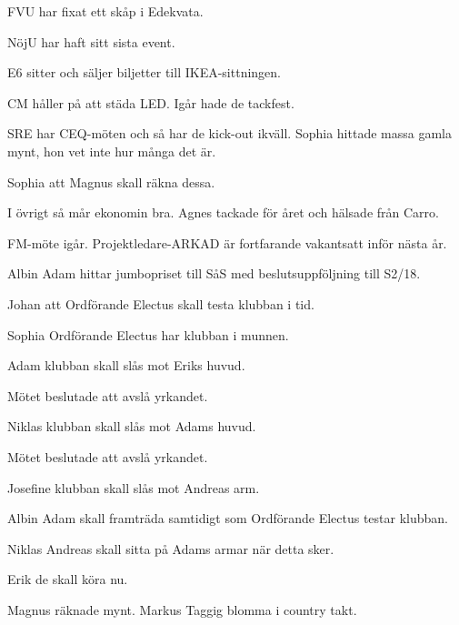 \documentclass[10pt]{article}
\begin{document}
\begin{paragrafer}
\begin{paragrafer}
FVU har fixat ett skåp i Edekvata.

NöjU har haft sitt sista event.

E6 sitter och säljer biljetter till IKEA-sittningen.

CM håller på att städa LED. Igår hade de tackfest.

SRE har CEQ-möten och så har de kick-out ikväll.
Sophia hittade massa gamla mynt, hon vet inte hur många det är.

Sophia \ypa att Magnus skall räkna dessa.

\Mbaby

I övrigt så mår ekonomin bra.
Agnes tackade för året och hälsade från Carro.

FM-möte igår. Projektledare-ARKAD är fortfarande vakantsatt inför nästa år.

\end{paragrafer}

Albin \ypa Adam hittar jumbopriset till SåS med beslutsuppföljning till S2/18.

\Mbaby
{}
Johan \ypa att Ordförande Electus skall testa klubban i tid.

\Mbaby

Sophia \ypa Ordförande Electus har klubban i munnen.

\Mbaby

Adam \ypa klubban skall slås mot Eriks huvud.

Mötet beslutade att avslå yrkandet.

Niklas \ypa klubban skall slås mot Adams huvud.

Mötet beslutade att avslå yrkandet.

Josefine \ypa klubban skall slås mot Andreas arm.

\Mbaby

Albin \ypa Adam skall framträda samtidigt som Ordförande Electus testar klubban.

\Mbaby

Niklas \ypa Andreas skall sitta på Adams armar när detta sker.

\Mbaby

Erik \ypa de skall köra nu.

\Mbaby

Magnus räknade mynt.
Markus \ypa Taggig blomma i country takt.

\Mbaby


\end{paragrafer}
\end{document}
